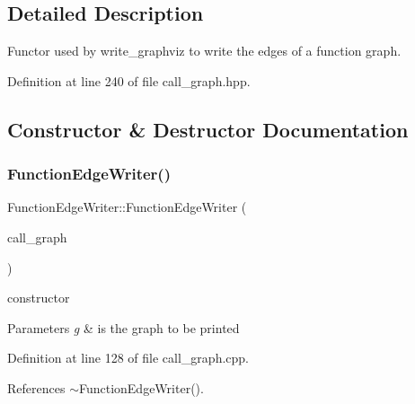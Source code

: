 \subsection{Detailed Description}
Functor used by write\+\_\+graphviz to write the edges of a function graph. 

Definition at line 240 of file call\+\_\+graph.\+hpp.



\subsection{Constructor \& Destructor Documentation}
\mbox{\label{classFunctionEdgeWriter_ac4ea641ac563ef834f68da6da35465e8}} 
\subsubsection{\texorpdfstring{Function\+Edge\+Writer()}{FunctionEdgeWriter()}}
{\footnotesize\ttfamily Function\+Edge\+Writer\+::\+Function\+Edge\+Writer (\begin{DoxyParamCaption}\item[{const \hyperlink{classCallGraph}{Call\+Graph} $\ast$}]{call\+\_\+graph }\end{DoxyParamCaption})\hspace{0.3cm}{\ttfamily [explicit]}}



constructor 


\begin{DoxyParams}{Parameters}
{\em g} & is the graph to be printed \\
\hline
\end{DoxyParams}


Definition at line 128 of file call\+\_\+graph.\+cpp.



References $\sim$\+Function\+Edge\+Writer().

